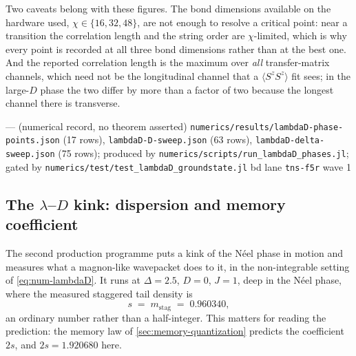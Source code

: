 Two caveats belong with these figures. The bond dimensions available on the
hardware used, $\chi\in\{16,32,48\}$, are not enough to resolve a critical
point: near a transition the correlation length and the string order are
$\chi$-limited, which is why every point is recorded at all three bond
dimensions rather than at the best one. And the reported correlation length is
the maximum over \emph{all} transfer-matrix channels, which need not be the
longitudinal channel that a $\langle S^zS^z\rangle$ fit sees; in the large-$D$
phase the two differ by more than a factor of two because the longest channel
there is transverse.

{--- (numerical record, no theorem asserted)}
{\texttt{numerics/\allowbreak{}results/\allowbreak{}lambdaD-\allowbreak{}phase-\allowbreak{}points.json} (17 rows),
 \texttt{lambdaD-\allowbreak{}D-\allowbreak{}sweep.json} (63 rows),
 \texttt{lambdaD-\allowbreak{}delta-\allowbreak{}sweep.json} (75 rows); produced by
 \texttt{numerics/\allowbreak{}scripts/\allowbreak{}run\_\allowbreak{}lambdaD\_\allowbreak{}phases.jl}; gated by
 \texttt{numerics/\allowbreak{}test/\allowbreak{}test\_\allowbreak{}lambdaD\_\allowbreak{}groundstate.jl}}
{bd lane \texttt{tns-f5r} wave 1}

\subsection{The \texorpdfstring{$\lambda$--$D$}{lambda-D} kink: dispersion and memory coefficient}\label{sec:numerics-kink}

The second production programme puts a kink of the N\'eel phase in motion and
measures what a magnon-like wavepacket does to it, in the non-integrable
setting of \cref{eq:num-lambdaD}. It runs at $\Delta=2.5$, $D=0$, $J=1$, deep
in the N\'eel phase, where the measured staggered tail density is
\begin{equation}
  s \;=\; m_{\text{stag}} \;=\; 0.960340 ,
  \label{eq:num-s}
\end{equation}
an ordinary number rather than a half-integer. This matters for reading the
prediction: the memory law of \cref{sec:memory-quantization} predicts the
coefficient $2s$, and $2s = 1.920680$ here.

